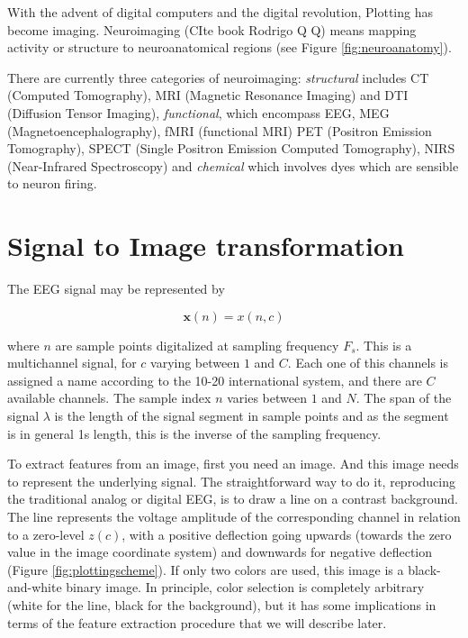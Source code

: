 \begin{story}[Neuroimaging]
With the advent of digital computers and the digital revolution, Plotting has become imaging.  Neuroimaging (CIte book Rodrigo Q Q) means mapping activity or structure to neuroanatomical regions (see Figure \ref{fig:neuroanatomy}).

There are currently three categories of neuroimaging: \textit{structural} includes CT (Computed Tomography), MRI (Magnetic Resonance Imaging) and DTI (Diffusion Tensor Imaging), \textit{functional}, which encompass EEG, MEG (Magnetoencephalography), fMRI (functional MRI) PET (Positron Emission Tomography), SPECT (Single Positron Emission Computed Tomography), NIRS (Near-Infrared Spectroscopy) and \textit{chemical} which involves dyes which are sensible to neuron firing.
\end{story}

\section{Signal to Image transformation}

The EEG signal may be represented by

\begin{equation}
\mathbf{x}(n) = x(n,c)
\label{eq:zerolevel}
\end{equation}

\noindent where $n$ are sample points digitalized at sampling frequency $F_s$.  This is a multichannel signal, for $c$ varying between $1$ and $C$.  Each one of this channels is assigned a name according to the 10-20 international system, and there are $C$ available channels. The sample index $n$ varies between $1$ and $N$.  The span of the signal $\lambda$ is the length of the signal segment in sample points and as the segment is in general 1s length, this is the inverse of the sampling frequency.

\vspace{10pt}


To extract features from an image, first you need an image.  And this image needs to represent the underlying signal.  The straightforward way to do it, reproducing the traditional analog or digital EEG, is to draw a line on a contrast background.  The line represents the voltage amplitude of the corresponding channel in relation to a zero-level $z(c)$, with a positive deflection going upwards (towards the zero value in the image coordinate system) and downwards for negative deflection (Figure \ref{fig:plottingscheme}).  If only two colors are used, this image is a black-and-white binary image.  In principle, color selection is completely arbitrary (white for the line, black for the background), but it has some implications in terms of the feature extraction procedure that we will describe later.

